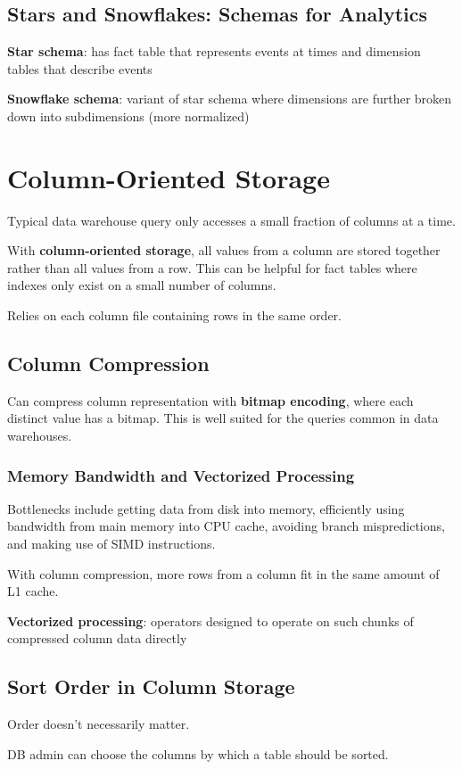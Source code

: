 \documentclass[11pt]{article}
\begin{document}
\subsection{Stars and Snowflakes: Schemas for Analytics}
\label{sec:orge6435da}
\textbf{Star schema}: has fact table that represents events at times and
dimension tables that describe events

\textbf{Snowflake schema}: variant of star schema where dimensions are
further broken down into subdimensions (more normalized)
\section{Column-Oriented Storage}
\label{sec:org73b76a8}
Typical data warehouse query only accesses a small fraction of
columns at a time.

With \textbf{column-oriented storage}, all values from a column are stored
together rather than all values from a row.
This can be helpful for fact tables where indexes only exist on a
small number of columns.

Relies on each column file containing rows in the same order.
\subsection{Column Compression}
\label{sec:org1e43554}
Can compress column representation with \textbf{bitmap encoding}, where each distinct
value has a bitmap.
This is well suited for the queries common in data warehouses.
\subsubsection{Memory Bandwidth and Vectorized Processing}
\label{sec:org9460418}
Bottlenecks include getting data from disk into memory, efficiently using
bandwidth from main memory into CPU cache, avoiding branch mispredictions, and
making use of SIMD instructions.

With column compression, more rows from a column fit in the same amount of L1
cache.

\textbf{Vectorized processing}: operators designed to operate on such chunks of
compressed column data directly
\subsection{Sort Order in Column Storage}
\label{sec:orgb35416d}
Order doesn't necessarily matter.

DB admin can choose the columns by which a table should be sorted.
\end{document}

